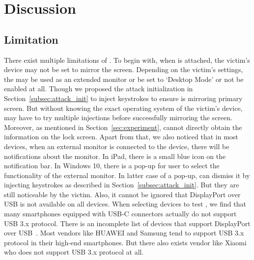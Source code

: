 \section{Discussion}
\label{sec:discussion}

\subsection{Limitation}
There exist multiple limitations of \tool. To begin with, when \tool is attached, the victim's device may not be set to mirror the screen. 
Depending on the victim's settings, the \tool may be used as an extended monitor or be set to `Desktop Mode' or not be enabled at all. Though we proposed the attack initialization in Section~\ref{subsec:attack_init} to inject keystrokes to ensure \tool is mirroring primary screen. But without knowing the exact operating system of the victim's device, \tool may have to try multiple injections before successfully mirroring the screen.
Moreover, as mentioned in Section~\ref{sec:experiment}, \tool cannot directly obtain the information on the lock screen.
 Apart from that, we also noticed that in most devices, when an external monitor is connected to the device, there will be notifications about the monitor. In iPad, there is a small blue icon on the notification bar. In Windows 10, there is a pop-up for user to select the functionality of the external monitor. In latter case of a pop-up, \tool can dismiss it by injecting keystrokes as described in Section~\ref{subsec:attack_init}. But they are still noticeable by the victim. Also, it cannot be ignored that DisplayPort over \ac{USB} is not available on all devices. When selecting devices to test \tool, we find that many smartphones equipped with USB-C connectors actually do not support \ac{USB} 3.x protocol. There is an incomplete list of devices that support DisplayPort over \ac{USB}~\cite{usbclist}. Most vendors like HUAWEI and Samsung tend to support \ac{USB} 3.x protocol in their \mbox{high-end} smartphones. But there also exists vendor like Xiaomi who does not support \ac{USB} 3.x protocol at all. 

\begin{comment}
There exist multiple limitations of \tool.  To begin with, \tool can only gain
the information and control access of the host itself instead of external
hardware.  Consequently, as we introduced in the
Section~\ref{sec:countermeasures}, \tool can hardly bypass the defense
approaches that use external hardware for authorization.  Moreover, most of
the devices will prompt users to give authentication to the \ac{USB} devices or
select one of the functional modes after they are plugged in.  Though some of
such prompts are not conspicuous for non-experts, especially when \tool is
concealed within other functional hardware such as power banks \shuqing{If
there is experiment, add it here.}, the probability of whether users could get
aware that something unusual happens will increase with the existence of these
prompting messages.
\end{comment}
